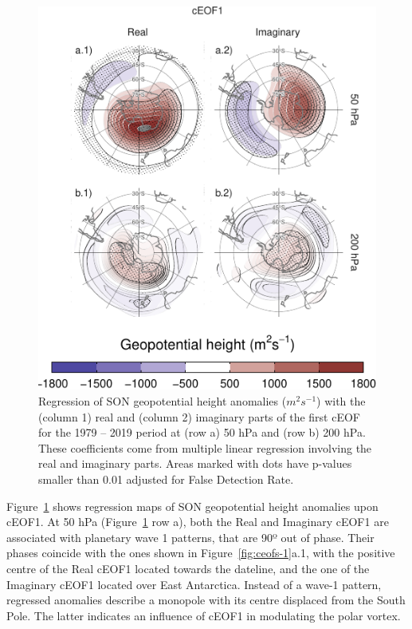 \documentclass[smallextended]{svjour3}       %
\begin{document}
\begin{figure}
\centering
\includegraphics{../figures/eof1-regr-gh-1.pdf}
\caption{\label{fig:eof1-regr-gh}Regression of SON geopotential height anomalies (\(m^2s^{-1}\)) with the (column 1) real and (column 2) imaginary parts of the first cEOF for the 1979 -- 2019 period at (row a) 50 hPa and (row b) 200 hPa. These coefficients come from multiple linear regression involving the real and imaginary parts. Areas marked with dots have p-values smaller than 0.01 adjusted for False Detection Rate.}
\end{figure}

Figure~\ref{fig:eof1-regr-gh} shows regression maps of SON geopotential height anomalies upon cEOF1.
At 50 hPa (Figure~\ref{fig:eof1-regr-gh} row a), both the Real and Imaginary cEOF1 are associated with planetary wave 1 patterns, that are 90º out of phase.
Their phases coincide with the ones shown in Figure~\ref{fig:ceofs-1}a.1, with the positive centre of the Real cEOF1 located towards the dateline, and the one of the Imaginary cEOF1 located over East Antarctica.
Instead of a wave-1 pattern, regressed anomalies describe a monopole with its centre displaced from the South Pole. The latter indicates an influence of cEOF1 in modulating the polar vortex.
\end{document}
